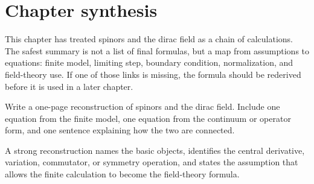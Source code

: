 \section{Chapter synthesis}

This chapter has treated spinors and the dirac field as a chain of calculations.  The safest summary is not a list of final formulas, but a map from assumptions to equations: finite model, limiting step, boundary condition, normalization, and field-theory use.  If one of those links is missing, the formula should be rederived before it is used in a later chapter.

\begin{exercise}
Write a one-page reconstruction of spinors and the dirac field.  Include one equation from the finite model, one equation from the continuum or operator form, and one sentence explaining how the two are connected.
\begin{answer}
A strong reconstruction names the basic objects, identifies the central derivative, variation, commutator, or symmetry operation, and states the assumption that allows the finite calculation to become the field-theory formula.
\end{answer}
\end{exercise}
